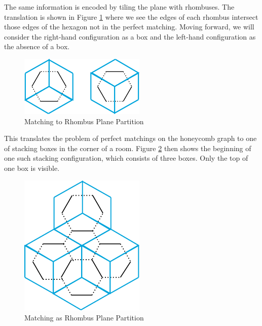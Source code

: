 \documentclass{article}
\begin{document}
The same information is encoded by tiling the plane with rhombuses. The translation is shown in Figure \ref{fig:honey_rhom} 	where we see the edges of each rhombus intersect those edges of the hexagon not in the perfect matching. Moving forward, we will consider the right-hand configuration as a box and the left-hand configuration as the absence of a box. 
\begin{figure}[htb!]
	\begin{center}
 	\includegraphics[width=6cm]{honey_rhombus.png}
  	\caption{Matching to Rhombus Plane Partition}
	 \label{fig:honey_rhom}
 	 \end{center}
\end{figure} 

This translates the problem of perfect matchings on the honeycomb graph to one of stacking boxes in the corner of a room. Figure \ref{fig:honey_match_rhom} then shows the beginning of one such stacking configuration, which consists of three boxes. Only the top of one box is visible. 
\begin{figure}[htb!]
	\begin{center}
 	\includegraphics[width=6cm]{honey_match_rhom.png}
  	\caption{Matching as Rhombus Plane Partition}
	 \label{fig:honey_match_rhom}
 	 \end{center}
\end{figure} 

	
	
\end{document}
